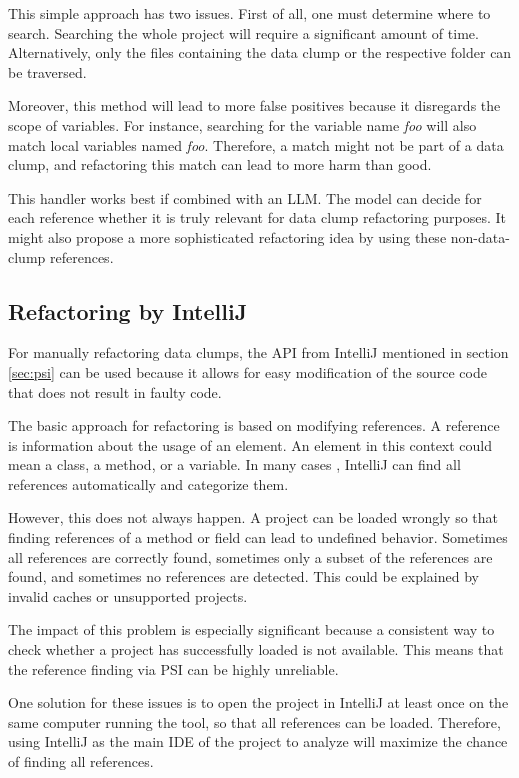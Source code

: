 This simple approach has two issues. First of all, one must determine where to search. Searching the whole project will require a significant amount of time. Alternatively, only the files containing the data clump or the respective folder can be traversed.

Moreover, this method will lead to more false positives because it disregards the scope of variables. For instance, searching for the variable name \textit{foo} will also match local variables named \textit{foo}. Therefore, a match might not be part of a data clump, and refactoring this match can lead to more harm than good. 

This handler works best if combined with an \ac{LLM}. The model can decide for each reference whether it is truly relevant for data clump refactoring purposes. It might also propose a more sophisticated refactoring idea by using these non-data-clump references. 

\subsection{Refactoring by IntelliJ} \label{sec:intellij_refactoring}

For  manually refactoring data clumps, the  \ac{API} from IntelliJ mentioned in section \ref{sec:psi} can be used because it allows for easy modification of the source code that does not result in faulty code. 





The basic approach for refactoring is based on modifying references. A  reference is  information about the usage of an element. An element in this context could mean a class, a method, or a variable.
In many cases , IntelliJ can find all references automatically and categorize them.

However, this does not always happen. A project can be loaded wrongly so that  finding references of a method or field can lead to undefined behavior. Sometimes all references are correctly found, sometimes only a subset of the references are found, and sometimes no references are detected. This could be explained by invalid caches or unsupported projects.

The impact of this problem is especially significant because a consistent way to check  whether a project has successfully loaded is not available. This means that the reference finding via \ac{PSI} can be highly unreliable. 

One solution for these issues is to open the project in IntelliJ at least once  on the same computer running the tool, so that all references can be loaded. Therefore, using IntelliJ as the main \ac{IDE} of the project to analyze will maximize the chance of finding all references.



